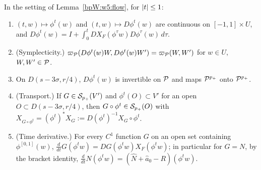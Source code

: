 \begin{lemma}\label{bpW:w5:flow-calc}
In the setting of Lemma~\ref{bpW:w5:flow}, for $\lvert t\rvert\le1$:
\begin{enumerate}[label=(\roman*)]
\item $(t,w)\mapsto\phi^t(w)$ and $(t,w)\mapsto D\phi^t(w)$ are continuous on $[-1,1]\times U$, and
  $D\phi^t(w)=I+\int_0^tDX_F(\phi^\tau w)D\phi^\tau(w)\,d\tau$.
\item (Symplecticity.) $\varpi_{\mathcal P}(D\phi^t(w)W,D\phi^t(w)W')=\varpi_{\mathcal P}(W,W')$ for $w\in U$, $W,W'\in\mathcal P$.
\item On $D(s-3\sigma,r/4)$, $D\phi^t(w)$ is invertible on $\mathcal P$ and maps $\mathcal P^{p_+}$ onto $\mathcal P^{p_+}$.
\item (Transport.) If $G\in\mathcal S_{p_+}(V')$ and $\phi^t(O)\subset V'$ for an open $O\subset D(s-3\sigma,r/4)$, then
  $G\circ\phi^t\in\mathcal S_{p_+}(O)$ with $X_{G\circ\phi^t}=(\phi^t)^*X_G:=D(\phi^t)^{-1}X_G\circ\phi^t$.
\item (Time derivative.) For every $C^1$ function $G$ on an open set containing $\phi^{[0,1]}(w)$,
  $\frac d{dt}G(\phi^tw)=DG(\phi^tw)X_F(\phi^tw)$; in particular for $G=N$, by the bracket identity,
  $\frac d{dt}N(\phi^tw)=(\hat N+\hat a_0-R)(\phi^tw)$.
\end{enumerate}
\end{lemma}

